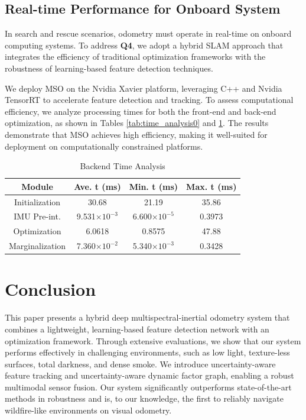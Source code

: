 \subsection{Real-time Performance for Onboard System}
\label{sec:real-time}
In search and rescue scenarios, odometry must operate in real-time on onboard computing systems. To address \textbf{Q4}, we adopt a hybrid SLAM approach that integrates the efficiency of traditional optimization frameworks with the robustness of learning-based feature detection techniques.

We deploy MSO on the Nvidia Xavier platform, leveraging C++ and Nvidia TensorRT to accelerate feature detection and tracking. To assess computational efficiency, we analyze processing times for both the front-end and back-end optimization, as shown in Tables \ref{tab:time_analysis0} and \ref{tab:time_analysis1}. The results demonstrate that MSO achieves high efficiency, making it well-suited for deployment on computationally constrained platforms.




\begin{table}
\footnotesize
      \caption{Backend Time Analysis}
      \centering
      \begin{tabular}{c|ccc}
        \toprule
        Module & Ave. t (ms) & Min. t (ms) & Max. t (ms) \\
        \midrule
        Initialization &30.68 &21.19 &35.86   \\
        IMU Pre-int. & 9.531$\times 10^{-3}$ & 6.600$\times 10^{-5}$ & 0.3973 \\
        Optimization   &6.0618 & 0.8575 &47.88 \\
        Marginalization &7.360$\times 10^{-2}$ & 5.340$\times 10^{-3}$ & 0.3428\\
        \bottomrule
      \end{tabular}
      \label{tab:time_analysis1}
\end{table}

\section{Conclusion}
\label{sec:conclusion}
This paper presents a hybrid deep multispectral-inertial odometry system that combines a lightweight, learning-based feature detection network with an optimization framework. Through extensive evaluations, we show that our system performs effectively in challenging environments, such as low light, texture-less surfaces, total darkness, and dense smoke. We introduce uncertainty-aware feature tracking and uncertainty-aware dynamic factor graph, enabling a robust multimodal sensor fusion. Our system significantly outperforms state-of-the-art methods in robustness and is, to our knowledge, the first to reliably navigate wildfire-like environments on visual odometry.


